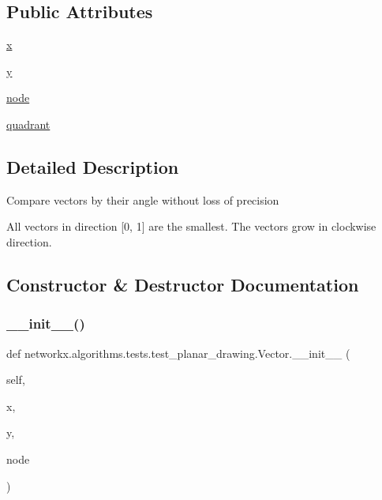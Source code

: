 \subsection*{Public Attributes}
\begin{DoxyCompactItemize}
\item 
\hyperlink{classnetworkx_1_1algorithms_1_1tests_1_1test__planar__drawing_1_1Vector_aee97bd5f43d0150508fc1487ce252897}{x}
\item 
\hyperlink{classnetworkx_1_1algorithms_1_1tests_1_1test__planar__drawing_1_1Vector_a0bf8986b1ca75c5c689d13a5c9fbf934}{y}
\item 
\hyperlink{classnetworkx_1_1algorithms_1_1tests_1_1test__planar__drawing_1_1Vector_a9f918dbe66cff416ed929e030ed91394}{node}
\item 
\hyperlink{classnetworkx_1_1algorithms_1_1tests_1_1test__planar__drawing_1_1Vector_abd537ceeeb94767dd1db3f9b547dedc9}{quadrant}
\end{DoxyCompactItemize}


\subsection{Detailed Description}
\begin{DoxyVerb}Compare vectors by their angle without loss of precision

All vectors in direction [0, 1] are the smallest.
The vectors grow in clockwise direction.
\end{DoxyVerb}
 

\subsection{Constructor \& Destructor Documentation}
\mbox{\label{classnetworkx_1_1algorithms_1_1tests_1_1test__planar__drawing_1_1Vector_ae12a093b25f636e1cabd33e08a45f9c4}} 
\subsubsection{\texorpdfstring{\+\_\+\+\_\+init\+\_\+\+\_\+()}{\_\_init\_\_()}}
{\footnotesize\ttfamily def networkx.\+algorithms.\+tests.\+test\+\_\+planar\+\_\+drawing.\+Vector.\+\_\+\+\_\+init\+\_\+\+\_\+ (\begin{DoxyParamCaption}\item[{}]{self,  }\item[{}]{x,  }\item[{}]{y,  }\item[{}]{node }\end{DoxyParamCaption})}



